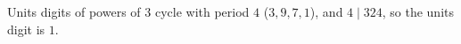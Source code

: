 Units digits of powers of $3$ cycle with period $4$ ($3,9,7,1$), and $4\mid324$, so the units digit is $\boxed{1}$.
